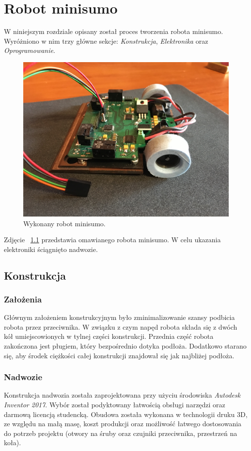 \chapter{Robot minisumo}

W niniejszym rozdziale opisany został proces tworzenia robota minisumo. Wyróżniono w nim trzy główne sekcje: \textit{Konstrukcja}, \textit{Elektronika} oraz \textit{Oprogramowanie}.

\begin{figure}[H]
	\centering
		\includegraphics[width=0.75\linewidth]{pic04/minisumo.JPG}
	\caption{Wykonany robot minisumo.}
	\label{fig:robot}	
\end{figure}

Zdjęcie ~\ref{fig:robot} przedstawia omawianego robota minisumo. W celu ukazania elektroniki ściągnięto nadwozie.

\newpage 

\section{Konstrukcja}
\subsection{Założenia}
Głównym założeniem konstrukcyjnym było zminimalizowanie szansy podbicia robota przez przeciwnika. W związku z czym napęd robota składa się z dwóch kół umiejscowionych w tylnej części konstrukcji. Przednia część robota zakończona jest pługiem, który bezpośrednio dotyka podłoża. Dodatkowo starano się, aby środek ciężkości całej konstrukcji znajdował się jak najbliżej podłoża.

\subsection{Nadwozie}
Konstrukcja nadwozia została zaprojektowana przy użyciu środowiska \textit{Autodesk Inventor 2017}. Wybór został podyktowany łatwością obsługi narzędzi oraz darmową licencją studencką. Obudowa została wykonana w technologii druku 3D, ze względu na małą masę, koszt produkcji oraz możliwość łatwego dostosowania do potrzeb projektu (otwory na śruby oraz czujniki przeciwnika, przestrzeń na koła).  

